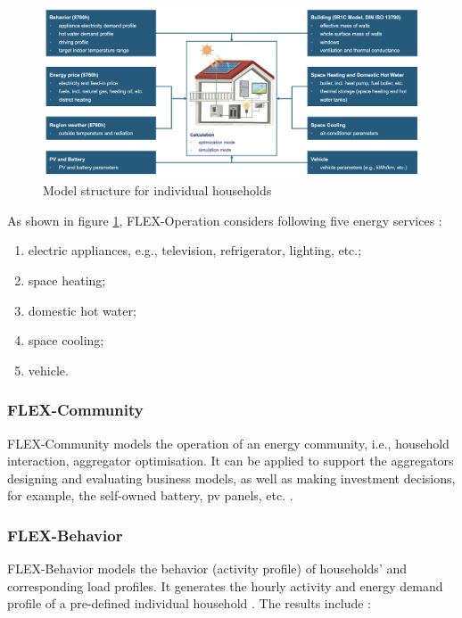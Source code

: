\begin{figure}[h]
  \centering
  \includegraphics[width=\textwidth]{Images/flex-operation.png}
  \caption{Model structure for individual households}
  \label{fig:flex-operation}
\end{figure}

As shown in figure \ref{fig:flex-operation}, FLEX-Operation considers following five energy services \cite{newtrends}:

\begin{enumerate}
  \item electric appliances, e.g., television, refrigerator, lighting, etc.;
  \item space heating;
  \item domestic hot water;
  \item space cooling;
  \item vehicle. 
\end{enumerate}


\subsubsection{FLEX-Community}


FLEX-Community models the operation of an energy community, i.e., household interaction, aggregator optimisation. 
It can be applied to support the aggregators designing and evaluating business models, as well as making investment decisions, for example, the self-owned battery, \gls{pv} panels, etc. \cite{newtrends}.


\subsubsection{FLEX-Behavior}


FLEX-Behavior models the behavior (activity profile) of households' and corresponding load profiles. 
It generates the hourly activity and energy demand profile of a pre-defined individual household \cite{newtrends}. 
The results include \cite{newtrends}: 

